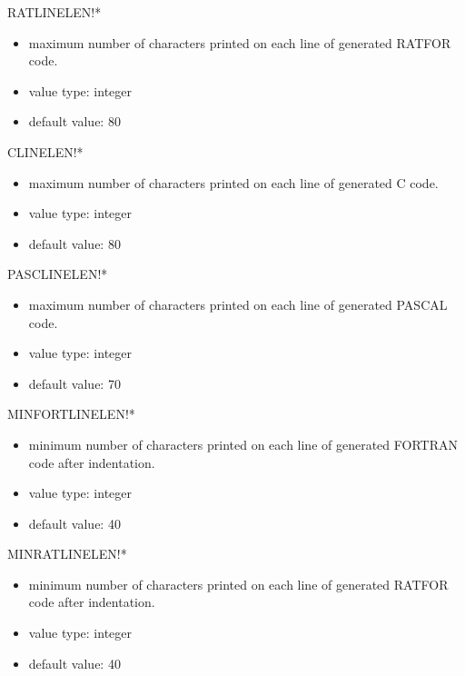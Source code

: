 \begin{describe}{RATLINELEN!*}
\begin{itemize}
\item maximum number of characters printed on each line of generated RATFOR
code.
\item value type:  integer
\item default value:  80
\end{itemize}
\end{describe}

\begin{describe}{CLINELEN!*}
\begin{itemize}
\item maximum number of characters printed on each line of generated C code.
\item value type:  integer
\item default value:  80
\end{itemize} 
\end{describe}

\begin{describe}{PASCLINELEN!*}
\begin{itemize}
\item maximum number of characters printed on each line of generated PASCAL
code.
\item value type:  integer
\item default value:  70
\end{itemize}
\end{describe}

\begin{describe}{MINFORTLINELEN!*}
\begin{itemize}
\item minimum number of characters printed on each line of generated FORTRAN
code after indentation.
\item value type:  integer
\item default value:  40
\end{itemize} 
\end{describe}

\begin{describe}{MINRATLINELEN!*}
\begin{itemize}
\item minimum number of characters printed on each line of generated RATFOR
code after indentation.
\item value type:  integer
\item default value:  40
\end{itemize} 
\end{describe}
 
